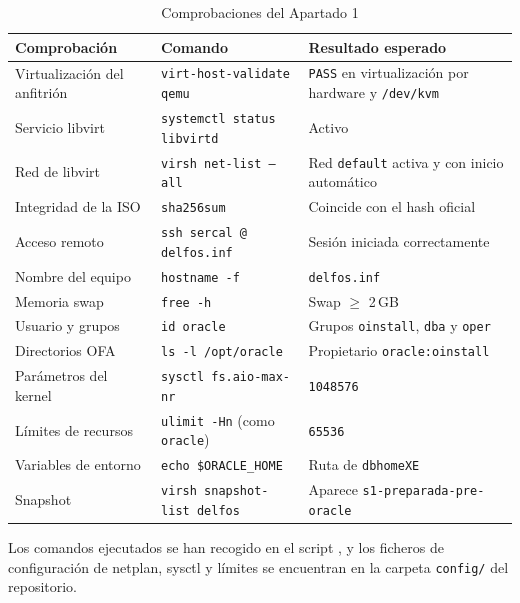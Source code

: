 \begin{table}[!htbp]
    \centering
    \small
    \begin{tabularx}{\textwidth}{L{3.6cm} L{4.6cm} Y}
        \toprule
        \textbf{Comprobación} & \textbf{Comando} & \textbf{Resultado esperado} \\
        \midrule
        Virtualización del anfitrión & \texttt{virt-host-validate qemu} & \texttt{PASS} en virtualización por hardware y \texttt{/dev/kvm} \\
        Servicio libvirt & \texttt{systemctl status libvirtd} & Activo \\
        Red de libvirt & \texttt{virsh net-list --all} & Red \texttt{default} activa y con inicio automático \\
        Integridad de la ISO & \texttt{sha256sum} & Coincide con el hash oficial \\
        Acceso remoto & \texttt{ssh sercal\,@\,delfos.inf} & Sesión iniciada correctamente \\
        Nombre del equipo & \texttt{hostname -f} & \texttt{delfos.inf} \\
        Memoria swap & \texttt{free -h} & Swap $\geq$ 2\,GB \\
        Usuario y grupos & \texttt{id oracle} & Grupos \texttt{oinstall}, \texttt{dba} y \texttt{oper} \\
        Directorios OFA & \texttt{ls -l /opt/oracle} & Propietario \texttt{oracle:oinstall} \\
        Parámetros del kernel & \texttt{sysctl fs.aio-max-nr} & \texttt{1048576} \\
        Límites de recursos & \texttt{ulimit -Hn} (como \texttt{oracle}) & \texttt{65536} \\
        Variables de entorno & \texttt{echo \$ORACLE\_HOME} & Ruta de \texttt{dbhomeXE} \\
        Snapshot & \texttt{virsh snapshot-list delfos} & Aparece \texttt{s1-preparada-pre-oracle} \\
        \bottomrule
    \end{tabularx}
    \caption{Comprobaciones del Apartado 1}
    \label{tab:verif1}
\end{table}

Los comandos ejecutados se han recogido en el script , y los ficheros de configuración de netplan, sysctl y límites se encuentran en la carpeta \texttt{config/} del repositorio.
